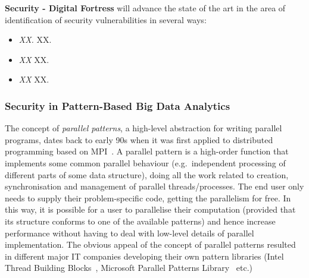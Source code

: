 \documentclass[a4paper,11pt]{article}
\newcommand{\project}[1]{\textbf{#1}\xspace}
\newcommand{\SECURITY}{\project{Security - Digital Fortress}}
\newcommand{\TheProject}{\SECURITY}
\begin{document}
\begin{mdframed}[backgroundcolor=gray!10]
\TheProject{} will advance the state of the art in the area of identification of security vulnerabilities in several ways:
\begin{itemize}
\item \emph{XX.} XX.
\item \emph{XX} XX.
\item \emph{XX} XX.
\end{itemize}
\end{mdframed}

\subsubsection{Security in Pattern-Based Big Data Analytics}
\label{sect:patterns}

The concept of \emph{parallel patterns}, a high-level abstraction for writing parallel programs, dates back to early 90s when it was first applied to distributed programming based on MPI~\cite{cole89skeletons}. A parallel pattern is a high-order function that implements some common parallel behaviour (e.g.~independent processing of different parts of some data structure), doing all the work related to creation, synchronisation and management of parallel threads/processes. The end user only needs to supply their problem-specific code, getting the parallelism for free. In this way, it is possible for a user to parallelise their computation (provided that its structure conforms to one of the available patterns) and hence increase performance without having to deal with low-level details of parallel implementation. The obvious appeal of the concept of parallel patterns resulted in different major IT companies developing their own pattern libraries (Intel Thread Building Blocks~\cite{tbb}, Microsoft Parallel Patterns Library~\cite{ppl} etc.)

\end{document}
